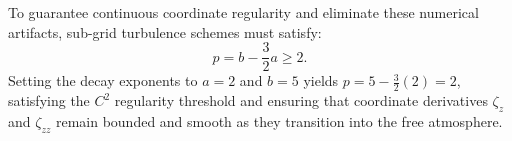 To guarantee continuous coordinate regularity and eliminate these numerical artifacts, sub-grid turbulence schemes must satisfy:
\begin{equation}
    p = b - \frac{3}{2}a \ge 2. \label{eq:exponent_threshold}
\end{equation}
Setting the decay exponents to $a = 2$ and $b = 5$ yields $p = 5 - \frac{3}{2}(2) = 2$, satisfying the $C^2$ regularity threshold and ensuring that coordinate derivatives $\zeta_z$ and $\zeta_{zz}$ remain bounded and smooth as they transition into the free atmosphere.